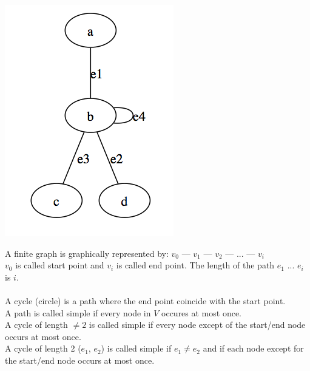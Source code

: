 \begin{example*}
\includegraphics[scale=0.5]{diagrams/Chapter1_Example2}
\end{example*}

A finite graph is graphically represented by: $v{_0}$ --- $v{_1}$ --- $v{_2}$ --- ... --- $v{_i}$\\
$v{_0}$ is called start point and $v{_i}$ is called end point. The length of the path $e{_1}$ ... $e{_i}$  is $i$.\\
\\
A cycle (circle) is a path where the end point coincide with the start point.\\
A path is called simple if every node in $V$ occures at most once.\\
A cycle of length $\neq 2$ is called simple if every node except of the start/end node occurs at most once. \\
A cycle of length 2 ($e{_1}$, $e{_2}$) is called simple if $e{_1} \neq e{_2}$ and if each node except for the start/end node occurs at most once.

